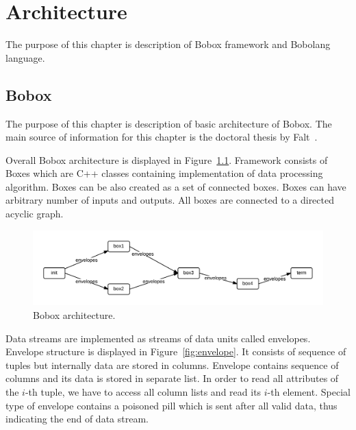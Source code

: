 \chapter{Architecture}
The purpose of this chapter is description of Bobox framework and Bobolang language.
\section{Bobox}

The purpose of this chapter is description of basic architecture of Bobox. The main source of information for this chapter is the doctoral thesis by Falt~\cite{faltthesis}. 

Overall Bobox architecture is displayed in Figure~\ref{fig:bobox}. Framework consists of Boxes which are C++ classes containing implementation of data processing algorithm. Boxes can be also created as a set of connected boxes. Boxes can have arbitrary number of inputs and outputs. All boxes are connected to a directed acyclic graph.  

\begin{figure}[h!]
  \centering
    \includegraphics[width=1\textwidth]{bobox}

      \caption{Bobox architecture.}
          \label{fig:bobox}
\end{figure}

Data streams are implemented as streams of data units called envelopes. Envelope structure is displayed in Figure~\ref{fig:envelope}. It consists of sequence of tuples but internally data are stored in columns. Envelope contains sequence of columns and its data is stored in separate list. In order to read all attributes of the $i$-th tuple, we have to access all column lists and read its $i$-th element. Special type of envelope contains a poisoned pill which is sent after all valid data, thus indicating the end of data stream. 

